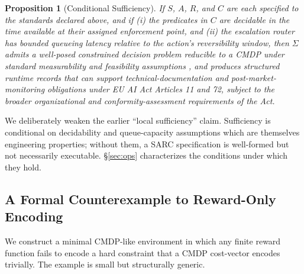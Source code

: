 \documentclass[11pt,a4paper]{article}
\newtheorem{proposition}{Proposition}
\theoremstyle{remark}
\begin{document}
\begin{proposition}[Conditional Sufficiency]\label{prop:suff}
If $S$, $A$, $R$, and $C$ are each specified to the standards declared above, and if (i) the predicates in $C$ are decidable in the time available at their assigned enforcement point, and (ii) the escalation router has bounded queueing latency relative to the action's reversibility window, then $\Sigma$ admits a well-posed constrained decision problem reducible to a CMDP under standard measurability and feasibility assumptions \cite{altman1999cmdp}, and produces structured runtime records that can support technical-documentation and post-market-monitoring obligations under EU AI Act Articles 11 and 72, subject to the broader organizational and conformity-assessment requirements of the Act.
\end{proposition}

We deliberately weaken the earlier ``local sufficiency'' claim. Sufficiency is conditional on decidability and queue-capacity assumptions which are themselves engineering properties; without them, a SARC specification is well-formed but not necessarily executable. \S\ref{sec:ops} characterizes the conditions under which they hold.

\subsection{A Formal Counterexample to Reward-Only Encoding}\label{sec:counter}

We construct a minimal CMDP-like environment in which any finite reward function fails to encode a hard constraint that a CMDP cost-vector encodes trivially. The example is small but structurally generic.
\end{document}
